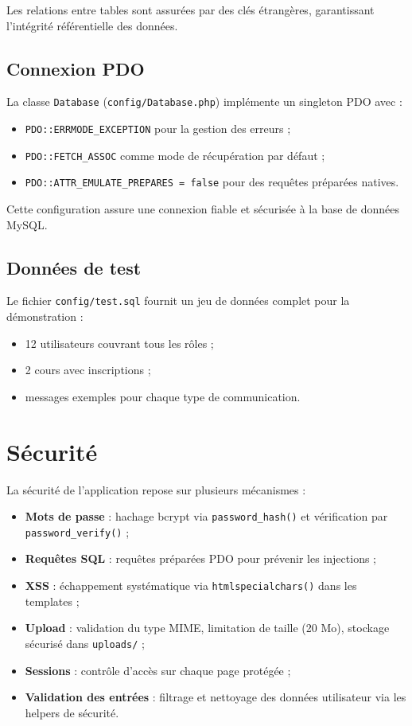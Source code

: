 \documentclass[12pt,a4paper]{article}
\begin{document}
Les relations entre tables sont assurées par des clés étrangères, garantissant l'intégrité référentielle des données.

\subsection{Connexion PDO}

La classe \texttt{Database} (\texttt{config/Database.php}) implémente un singleton PDO avec :
\begin{itemize}
  \item \texttt{PDO::ERRMODE\_EXCEPTION} pour la gestion des erreurs ;
  \item \texttt{PDO::FETCH\_ASSOC} comme mode de récupération par défaut ;
  \item \texttt{PDO::ATTR\_EMULATE\_PREPARES = false} pour des requêtes préparées natives.
\end{itemize}

Cette configuration assure une connexion fiable et sécurisée à la base de données MySQL.

\subsection{Données de test}

Le fichier \texttt{config/test.sql} fournit un jeu de données complet pour la démonstration :
\begin{itemize}
  \item 12 utilisateurs couvrant tous les rôles ;
  \item 2 cours avec inscriptions ;
  \item messages exemples pour chaque type de communication.
\end{itemize}

\section{Sécurité}

La sécurité de l'application repose sur plusieurs mécanismes :

\begin{itemize}
  \item \textbf{Mots de passe} : hachage bcrypt via \texttt{password\_hash()} et vérification par \texttt{password\_verify()} ;
  \item \textbf{Requêtes SQL} : requêtes préparées PDO pour prévenir les injections ;
  \item \textbf{XSS} : échappement systématique via \texttt{htmlspecialchars()} dans les templates ;
  \item \textbf{Upload} : validation du type MIME, limitation de taille (20 Mo), stockage sécurisé dans \texttt{uploads/} ;
  \item \textbf{Sessions} : contrôle d'accès sur chaque page protégée ;
  \item \textbf{Validation des entrées} : filtrage et nettoyage des données utilisateur via les helpers de sécurité.
\end{itemize}
\end{document}
